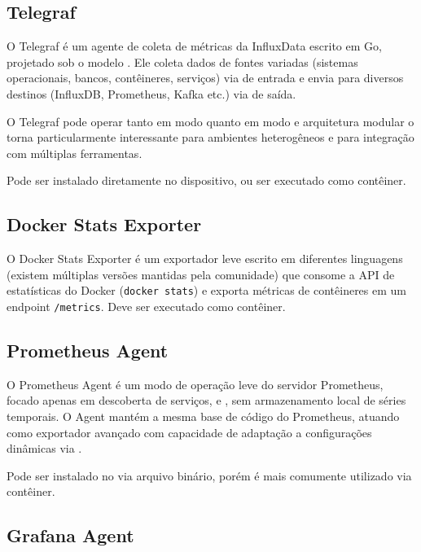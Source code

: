 \subsection{Telegraf}
\label{subsection:Telegraf}

O Telegraf \citep{telegraf2025} é um agente de coleta de métricas da InfluxData escrito em Go, projetado sob o modelo . Ele coleta dados de fontes variadas (sistemas operacionais, bancos, contêineres, serviços) via  de entrada e envia para diversos destinos (InfluxDB, Prometheus, Kafka etc.) via  de saída.

O Telegraf pode operar tanto em modo  quanto em modo  e arquitetura modular o torna particularmente interessante para ambientes heterogêneos e para integração com múltiplas ferramentas.

Pode ser instalado diretamente no dispositivo, ou ser executado como contêiner.

\subsection{Docker Stats Exporter}
\label{subsection:DockerStatsExporter}

O Docker Stats Exporter \citep{dockerstatsexporter2025} é um exportador leve escrito em diferentes linguagens (existem múltiplas versões mantidas pela comunidade) que consome a API de estatísticas do Docker (\verb|docker stats|) e exporta métricas de contêineres em um endpoint \verb|/metrics|. 
Deve ser executado como contêiner.

\subsection{Prometheus Agent}
\label{subsection:PrometheusAgent}

O Prometheus Agent \citep{promagent2025} é um modo de operação leve do servidor Prometheus, focado apenas em descoberta de serviços,  e , sem armazenamento local de séries temporais. O Agent mantém a mesma base de código do Prometheus, atuando como exportador avançado com capacidade de adaptação a configurações dinâmicas via .

Pode ser instalado no  via arquivo binário, porém é mais comumente utilizado via contêiner.

\subsection{Grafana Agent}
\label{subsection:GrafanaAgent}

